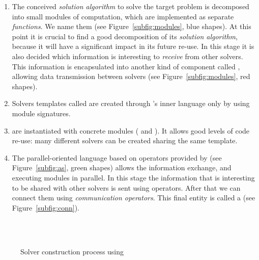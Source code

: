 \begin{enumerate}
\item The conceived \textit{solution algorithm} to solve the target problem is decomposed into small modules of computation, which are implemented as separate {\it functions}. We name them \oms{} (see Figure~\ref{subfig:modules}, blue shapes). At this point it is crucial to find a good decomposition of its \textit{solution algorithm}, because it will have a significant impact in its future re-use. In this stage it is also decided which information is interesting to \textit{receive} from other solvers. This information is encapsulated into another kind of component called \opch, allowing data transmission between solvers (see Figure~\ref{subfig:modules}, red shapes).
\item Solvers templates called \INTROass{} are created through \posl{}'s inner language only by using module signatures. 
\item \Ass{} are instantiated with concrete modules (\oms{} and \opchs). It allows good levels of code re-use: many different solvers can be created sharing the same template. %
\item The parallel-oriented language based on operators provided by \posl{} (see Figure~\ref{subfig:as}, green shapes) allows the information exchange, and executing modules in parallel. In this stage the information that is interesting to be shared with other solvers is sent using operators. After that we can connect them using {\it communication operators}. This final entity is called a \INTROsoset{} (see Figure~\ref{subfig:conn}).
\end{enumerate}

\begin{figure}[h]
	\centering
	\\
	\\
	\caption[]{Solver construction process using \posl}
	\label{fig:posl}
\end{figure}


